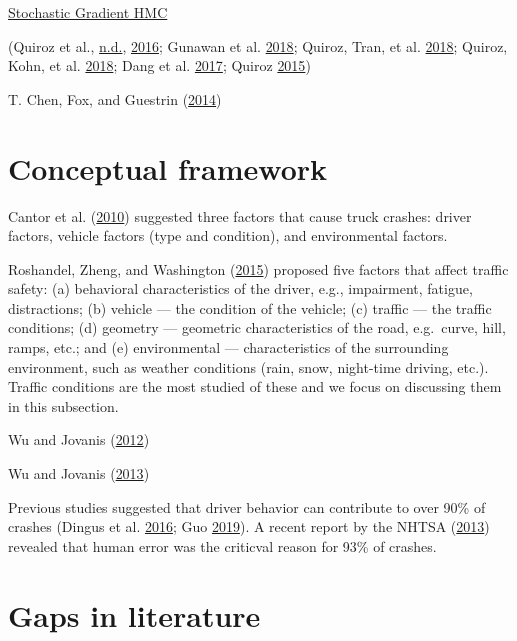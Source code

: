 \documentclass[12pt]{book}
\numberwithin{equation}{chapter}
\begin{document}
\href{https://blog.csdn.net/u013841458/article/details/82495450}{Stochastic Gradient HMC}

(Quiroz et al., \protect\hyperlink{ref-quirozsubsampling}{n.d.}, \protect\hyperlink{ref-quiroz2016block}{2016}; Gunawan et al. \protect\hyperlink{ref-gunawan2018subsampling}{2018}; Quiroz, Tran, et al. \protect\hyperlink{ref-quiroz2018speeding}{2018}; Quiroz, Kohn, et al. \protect\hyperlink{ref-quiroz2018speeding1}{2018}; Dang et al. \protect\hyperlink{ref-dang2017hamiltonian}{2017}; Quiroz \protect\hyperlink{ref-quiroz2015bayesian}{2015})

T. Chen, Fox, and Guestrin (\protect\hyperlink{ref-chen2014stochastic}{2014})

\hypertarget{conceptual-framework}{%
\section{Conceptual framework}\label{conceptual-framework}}

Cantor et al. (\protect\hyperlink{ref-cantor2010driver}{2010}) suggested three factors that cause truck crashes: driver factors, vehicle factors (type and condition), and environmental factors.

Roshandel, Zheng, and Washington (\protect\hyperlink{ref-roshandel2015impact}{2015}) proposed five factors that affect traffic safety: (a) behavioral characteristics of the driver, e.g., impairment, fatigue, distractions; (b) vehicle --- the condition of the vehicle; (c) traffic --- the traffic conditions; (d) geometry --- geometric characteristics of the road, e.g.~curve, hill, ramps, etc.; and (e) environmental --- characteristics of the surrounding environment, such as weather conditions (rain, snow, night-time driving, etc.). Traffic conditions are the most studied of these and we focus on discussing them in this subsection.

Wu and Jovanis (\protect\hyperlink{ref-wu2012crashes}{2012})

Wu and Jovanis (\protect\hyperlink{ref-wu2013defining}{2013})

Previous studies suggested that driver behavior can contribute to over 90\% of crashes (Dingus et al. \protect\hyperlink{ref-dingus2016driver}{2016}; Guo \protect\hyperlink{ref-guo2019statistical}{2019}). A recent report by the NHTSA (\protect\hyperlink{ref-nhtsa2013national}{2013}) revealed that human error was the criticval reason for 93\% of crashes.

\hypertarget{gaps-in-literature}{%
\section{Gaps in literature}\label{gaps-in-literature}}
\end{document}
